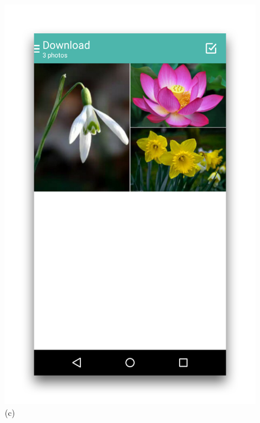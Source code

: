 \documentclass[11pt, a4paper]{report}
\begin{document}
\begin{figure}[h]
\begin{minipage}[b]{0.2\linewidth}
	\includegraphics[totalheight=6cm]{img/41.png}
	(c)
\end{minipage}
\begin{minipage}[b]{0.2\linewidth}
	\centering

\end{minipage}
\end{figure}
\end{document}
